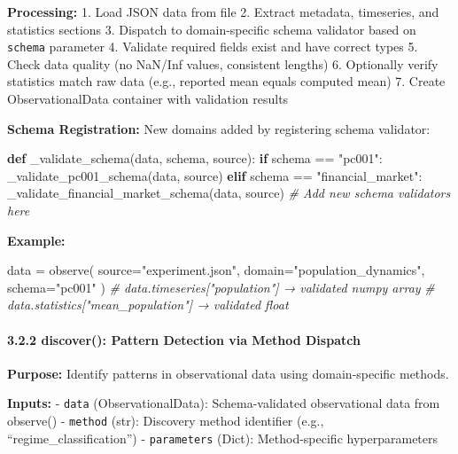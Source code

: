\documentclass[
]{article}
\newenvironment{Shaded}{}{}
\newcommand{\CommentTok}[1]{\textcolor[rgb]{0.38,0.63,0.69}{\textit{#1}}}
\newcommand{\ControlFlowTok}[1]{\textcolor[rgb]{0.00,0.44,0.13}{\textbf{#1}}}
\newcommand{\KeywordTok}[1]{\textcolor[rgb]{0.00,0.44,0.13}{\textbf{#1}}}
\newcommand{\NormalTok}[1]{#1}
\newcommand{\OperatorTok}[1]{\textcolor[rgb]{0.40,0.40,0.40}{#1}}
\newcommand{\StringTok}[1]{\textcolor[rgb]{0.25,0.44,0.63}{#1}}
\begin{document}
\textbf{Processing:} 1. Load JSON data from file 2. Extract metadata,
timeseries, and statistics sections 3. Dispatch to domain-specific
schema validator based on \texttt{schema} parameter 4. Validate required
fields exist and have correct types 5. Check data quality (no NaN/Inf
values, consistent lengths) 6. Optionally verify statistics match raw
data (e.g., reported mean equals computed mean) 7. Create
ObservationalData container with validation results

\textbf{Schema Registration:} New domains added by registering schema
validator:

\begin{Shaded}
\begin{Highlighting}[]
\KeywordTok{def}\NormalTok{ \_validate\_schema(data, schema, source):}
    \ControlFlowTok{if}\NormalTok{ schema }\OperatorTok{==} \StringTok{"pc001"}\NormalTok{:}
\NormalTok{        \_validate\_pc001\_schema(data, source)}
    \ControlFlowTok{elif}\NormalTok{ schema }\OperatorTok{==} \StringTok{"financial\_market"}\NormalTok{:}
\NormalTok{        \_validate\_financial\_market\_schema(data, source)}
    \CommentTok{\# Add new schema validators here}
\end{Highlighting}
\end{Shaded}

\textbf{Example:}

\begin{Shaded}
\begin{Highlighting}[]
\NormalTok{data }\OperatorTok{=}\NormalTok{ observe(}
\NormalTok{    source}\OperatorTok{=}\StringTok{"experiment.json"}\NormalTok{,}
\NormalTok{    domain}\OperatorTok{=}\StringTok{"population\_dynamics"}\NormalTok{,}
\NormalTok{    schema}\OperatorTok{=}\StringTok{"pc001"}
\NormalTok{)}
\CommentTok{\# data.timeseries["population"] → validated numpy array}
\CommentTok{\# data.statistics["mean\_population"] → validated float}
\end{Highlighting}
\end{Shaded}

\paragraph{3.2.2 discover(): Pattern Detection via Method
Dispatch}\label{discover-pattern-detection-via-method-dispatch}

\textbf{Purpose:} Identify patterns in observational data using
domain-specific methods.

\textbf{Inputs:} - \texttt{data} (ObservationalData): Schema-validated
observational data from observe() - \texttt{method} (str): Discovery
method identifier (e.g., ``regime\_classification'') -
\texttt{parameters} (Dict): Method-specific hyperparameters
\end{document}
